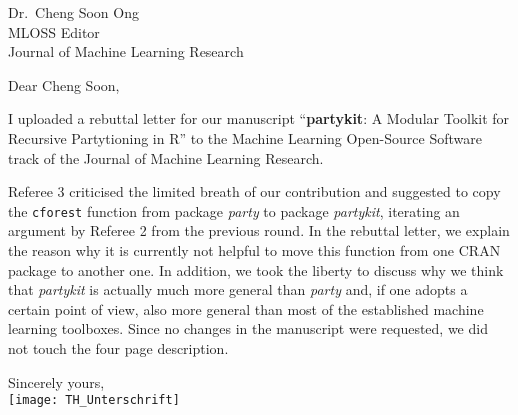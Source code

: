 \documentclass[ngerman,uzh]{scrlttr2}
\begin{document}

\begin{letter}{
Dr.~Cheng Soon Ong \\
MLOSS Editor \\
Journal of Machine Learning Research}

\subject{JMLR-14-133-3 revision}

\opening{Dear Cheng Soon,}

I uploaded a rebuttal letter for our manuscript
``\textbf{partykit}: A Modular Toolkit for Recursive Partytioning in R'' to the
Machine Learning Open-Source Software track of the Journal of Machine
Learning Research.

Referee 3 criticised the limited breath of our contribution and suggested to
copy the \texttt{cforest} function from package \emph{party} to package
\emph{partykit}, iterating an argument by Referee 2 from the previous
round. In the rebuttal letter, we explain the reason why it is currently not
helpful to move this function from one CRAN package to another one. In
addition, we took the liberty to discuss why we think that \emph{partykit}
is actually much more general than \emph{party} and, if one adopts a certain
point of view, also more general than most of the established machine
learning toolboxes. Since no changes in the manuscript were requested, we
did not touch the four page description.

Sincerely yours, \\
\texttt{[image: TH\_Unterschrift]}

\end{letter}
\end{document}

